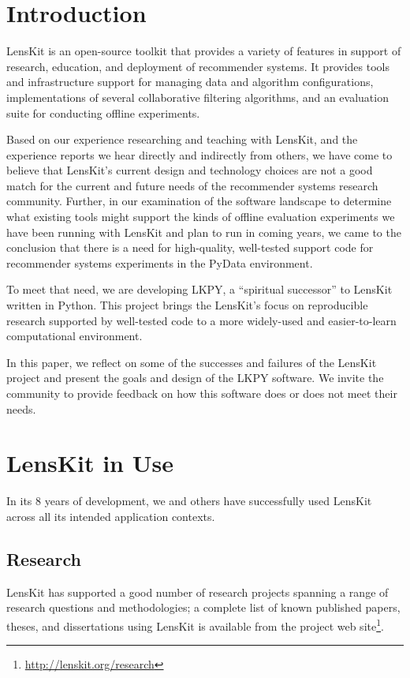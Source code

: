 \section{Introduction}

LensKit \citep{Ekstrand2011-bp} is an open-source toolkit that provides a variety of features in support of research, education, and deployment of recommender systems.
It provides tools and infrastructure support for managing data and algorithm configurations, implementations of several collaborative filtering algorithms, and an evaluation suite for conducting offline experiments.

Based on our experience researching and teaching with LensKit, and the experience reports we hear directly and indirectly from others, we have come to believe that LensKit's current design and technology choices are not a good match for the current and future needs of the recommender systems research community.
Further, in our examination of the software landscape to determine what existing tools might support the kinds of offline evaluation experiments we have been running with LensKit and plan to run in coming years, we came to the conclusion that there is a need for high-quality, well-tested support code for recommender systems experiments in the PyData environment.

To meet that need, we are developing LKPY, a ``spiritual successor'' to LensKit written in Python.
This project brings the LensKit's focus on reproducible research supported by well-tested code to a more widely-used and easier-to-learn computational environment.

In this paper, we reflect on some of the successes and failures of the LensKit project and present the goals and design of the LKPY software.
We invite the community to provide feedback on how this software does or does not meet their needs.

\section{LensKit in Use}

In its 8 years of development, we and others have successfully used LensKit across all its intended application contexts.

\subsection{Research}
LensKit has supported a good number of research projects spanning a range of research questions and methodologies; a complete list of known published papers, theses, and dissertations using LensKit is available from the project web site\footnote{\url{http://lenskit.org/research}}.

